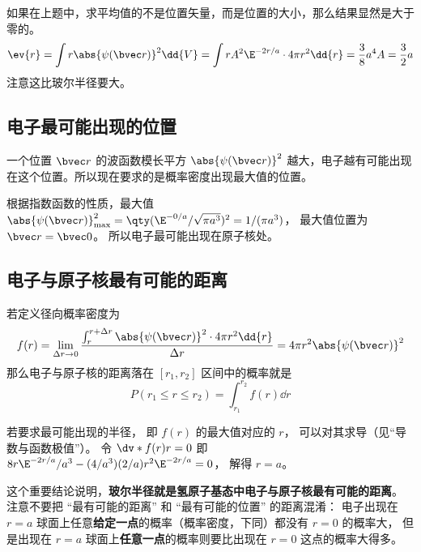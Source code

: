 如果在上题中，求平均值的不是位置矢量，而是位置的大小，那么结果显然是大于零的。
\begin{equation}
\ev{r} = \int r \abs{\psi (\bvec r)}^2 \dd{V} = \int r A^2 \E^{-2r/a} \cdot 4\pi r^2 \dd{r} = \frac{3}{8} a^4 A = \frac{3}{2}a
\end{equation}
注意这比玻尔半径要大。

\subsection{电子最可能出现的位置}

一个位置 $\bvec r$ 的波函数模长平方 $\abs{\psi(\bvec r)}^2$ 越大，电子越有可能出现在这个位置。所以现在要求的是概率密度出现最大值的位置。
 
根据指数函数的性质，最大值 $\abs{\psi (\bvec r)}_{\max}^2 = \qty( \E^{-0/a}/\sqrt{\pi a^3})^2 = 1/(\pi a^3)$， 最大值位置为 $\bvec r = \bvec 0$。 所以电子最可能出现在原子核处。

\subsection{电子与原子核最有可能的距离}
若定义径向概率密度为
\begin{equation}\label{HWF0_eq1}
f(r) = \lim_{\Delta r \to 0} \frac{\int_r^{r + \Delta r} {\abs{\psi (\bvec r)}}^2 \cdot 4\pi r^2 \dd{r} }{\Delta r} = 4\pi r^2 \abs{\psi(\bvec r)}^2
\end{equation}
那么电子与原子核的距离落在 $[r_1, r_2]$ 区间中的概率就是
\begin{equation}
P(r_1 \le r \le r_2) = \int_{r_1}^{r_2} f(r) \dd{r}
\end{equation}

若要求最可能出现的半径， 即 $f(r)$ 的最大值对应的 $r$， 可以对其求导（见“导数与函数极值”）。 令 $\dv*{f(r)}{r} = 0$ 即 $8 r \E^{-2r/a}/a^3 - (4/a^3)(2/a)r^2 \E^{-2r/a} = 0$， 解得 $r = a$。 
 
这个重要结论说明，\textbf{玻尔半径就是氢原子基态中电子与原子核最有可能的距离}。 注意不要把 “最有可能的距离” 和 “最有可能的位置” 的距离混淆： 电子出现在 $r = a$ 球面上任意\textbf{给定一点}的概率（概率密度，下同）都没有 $r = 0$ 的概率大， 但是出现在 $r = a$ 球面上\textbf{任意一点}的概率则要比出现在 $r = 0$ 这点的概率大得多。
